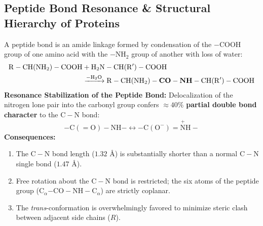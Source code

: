 \documentclass[10pt,a4paper]{article}
\begin{document}
\subsection{Peptide Bond Resonance \& Structural Hierarchy of Proteins}

\begin{conceptbox}
A peptide bond is an amide linkage formed by condensation of the $-\mathrm{COOH}$ group of one amino acid with the $-\mathrm{NH_2}$ group of another with loss of water:
\begin{align}
  \mathrm{R-CH(NH_2)-COOH} &+ \mathrm{H_2N-CH(R')-COOH} \notag \\
  &\xrightarrow{-\mathrm{H_2O}} \mathrm{R-CH(NH_2)-\mathbf{CO-NH}-CH(R')-COOH}
\end{align}
\textbf{Resonance Stabilization of the Peptide Bond:}
Delocalization of the nitrogen lone pair into the carbonyl group confers $\approx 40\%$ \textbf{partial double bond character} to the $\mathrm{C-N}$ bond:
\begin{equation}
  -\mathrm{C(=O)-NH}- \longleftrightarrow -\mathrm{C(O^-)=\overset{+}{N}H}-
\end{equation}
\textbf{Consequences:}
\begin{enumerate}
  \item The $\mathrm{C-N}$ bond length ($1.32\text{ \AA}$) is substantially shorter than a normal $\mathrm{C-N}$ single bond ($1.47\text{ \AA}$).
  \item Free rotation about the $\mathrm{C-N}$ bond is restricted; the six atoms of the peptide group ($\mathrm{C}_\alpha\mathrm{-CO-NH-C}_\alpha$) are strictly coplanar.
  \item The \textit{trans}-conformation is overwhelmingly favored to minimize steric clash between adjacent side chains ($R$).
\end{enumerate}
\end{conceptbox}
\end{document}
